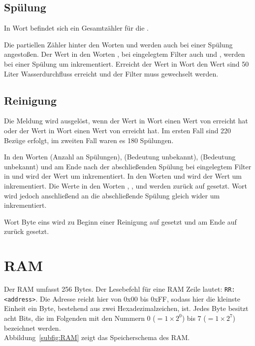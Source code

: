 \subsection{Spülung}
In Wort  befindet sich ein Gesamtzähler für die .

Die partiellen Zähler hinter den Worten  und  werden auch bei einer Spülung angestoßen.
Der Wert in den Worten , bei eingelegtem Filter auch  und , werden bei einer Spülung um  inkrementiert.
Erreicht der Wert in Wort  den Wert  sind 50 Liter Wasserdurchfluss erreicht und der Filter muss gewechselt werden.

\subsection{Reinigung}
Die Meldung wird ausgelöst, wenn der Wert in Wort  einen Wert von  erreicht hat oder der Wert in Wort  einen Wert von  erreicht hat.
Im ersten Fall sind 220 Bezüge erfolgt, im zweiten Fall waren es 180 Spülungen.

In den Worten  (Anzahl an Spülungen),  (Bedeutung unbekannt),  (Bedeutung unbekannt) und am Ende nach der abschließenden Spülung bei eingelegtem Filter in  und  wird der Wert um  inkrementiert.
In den Worten  und  wird der Wert um  inkrementiert.
Die Werte in den Worten , ,  und  werden zurück auf  gesetzt.
Wort  wird jedoch anschließend an die abschließende Spülung gleich wider um  inkrementiert.

Wort  Byte eins wird zu Beginn einer Reinigung auf  gesetzt und am Ende auf  zurück gesetzt.

\section{RAM}\label{sec:ErgebnisseRAM}
Der \acf{RAM} umfasst 256 Bytes.
Der Lesebefehl für eine \ac{RAM} Zeile lautet: \texttt{RR:<address>}.
Die Adresse reicht hier von 0x00 bis 0xFF, sodass hier die kleinste Einheit ein Byte, bestehend aus zwei Hexadezimalzeichen, ist.
Jedes Byte besitzt acht Bits, die im Folgenden mit den Nummern 0 ($=1\times 2^0$) bis 7 ($=1\times 2^7$) bezeichnet werden.\\
Abbildung~\ref{subfig:RAM} zeigt das Speicherschema des \ac{RAM}.


